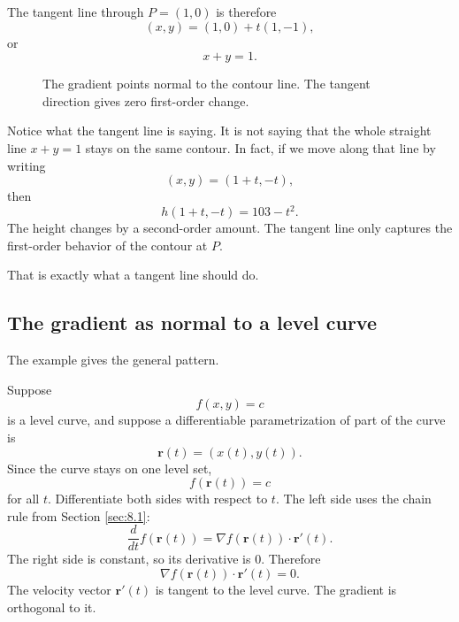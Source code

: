 The tangent line through \(P=(1,0)\) is therefore
\[
    (x,y)=(1,0)+t(1,-1),
\]
or
\[
\boxed{
    x+y=1.
}
\]

\begin{figure}[h]
\centering
{}
\caption{The gradient points normal to the contour line.  The tangent direction gives
zero first-order change.}
\end{figure}

Notice what the tangent line is saying.  It is not saying that the whole straight line
\(x+y=1\) stays on the same contour.  In fact, if we move along that line by writing
\[
    (x,y)=(1+t,-t),
\]
then
\[
    h(1+t,-t)=103-t^2.
\]
The height changes by a second-order amount.  The tangent line only captures the
first-order behavior of the contour at \(P\).

That is exactly what a tangent line should do.

\subsection{The gradient as normal to a level curve}

The example gives the general pattern.

Suppose
\[
    f(x,y)=c
\]
is a level curve, and suppose a differentiable parametrization of part of the curve is
\[
    \mathbf r(t)=(x(t),y(t)).
\]
Since the curve stays on one level set,
\[
    f(\mathbf r(t))=c
\]
for all \(t\).  Differentiate both sides with respect to \(t\).  The left side uses the chain
rule from Section \ref{sec:8.1}:
\[
    \frac{d}{dt}f(\mathbf r(t))
    =
    \nabla f(\mathbf r(t))\cdot \mathbf r'(t).
\]
The right side is constant, so its derivative is \(0\).  Therefore
\[
\boxed{
    \nabla f(\mathbf r(t))\cdot \mathbf r'(t)=0.
}
\]
The velocity vector \(\mathbf r'(t)\) is tangent to the level curve.  The gradient is
orthogonal to it.

